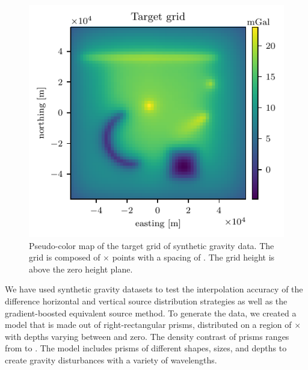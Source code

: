 \documentclass[twocolumn]{article}
\begin{document}
\begin{figure}
    \includegraphics[width=\linewidth]{figs/target-grid.pdf}
    \caption{
        Pseudo-color map of the target grid of synthetic gravity data. The grid
        is composed of \TargetEastingSize{}$\times$\TargetNorthingSize{} points
        with a spacing of \TargetSpacing{}. The grid height is \TargetHeight{}
        above the zero height plane.
    }
    \label{fig:synthetic-target}
\end{figure}

We have used synthetic gravity datasets to test the interpolation accuracy of
the difference horizontal and vertical source distribution strategies as well
as the gradient-boosted equivalent source method.
To generate the data, we created a model that is made out of \NPrisms{}
right-rectangular prisms, distributed on a region of
\ModelEasting{}$\times$\ModelNorthing{} with depths varying between
\ModelDepth{} and zero.
The density contrast of prisms ranges from \ModelMinDensity{} to
\ModelMaxDensity{}.
The model includes prisms of different shapes, sizes, and depths to create
gravity disturbances with a variety of wavelengths.
\end{document}

